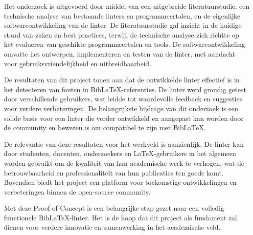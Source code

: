 Het onderzoek is uitgevoerd door middel van een uitgebreide literatuurstudie, een technische analyse van bestaande linters en programmeertalen, en de eigenlijke softwareontwikkeling van de linter. De literatuurstudie gaf inzicht in de huidige stand van zaken en best practices, terwijl de technische analyse zich richtte op het evalueren van geschikte programmeertalen en tools. De softwareontwikkeling omvatte het ontwerpen, implementeren en testen van de linter, met aandacht voor gebruiksvriendelijkheid en uitbreidbaarheid.

De resultaten van dit project tonen aan dat de ontwikkelde linter effectief is in het detecteren van fouten in BibLaTeX-referenties. De linter werd grondig getest door verschillende gebruikers, wat leidde tot waardevolle feedback en suggesties voor verdere verbeteringen. De belangrijkste bijdrage van dit onderzoek is een solide basis voor een linter die verder ontwikkeld en aangepast kan worden door de community en bewezen is om compatibel te zijn met BibLaTeX.

De relevantie van deze resultaten voor het werkveld is aanzienlijk. De linter kan door studenten, docenten, onderzoekers en \LaTeX-gebruikers in het algemeen worden gebruikt om de kwaliteit van hun academische werk te verhogen, wat de betrouwbaarheid en professionaliteit van hun publicaties ten goede komt. Bovendien biedt het project een platform voor toekomstige ontwikkelingen en verbeteringen binnen de open-source community.

Met deze Proof of Concept is een belangrijke stap gezet naar een volledig functionele BibLaTeX-linter. Het is de hoop dat dit project als fundament zal dienen voor verdere innovatie en samenwerking in het academische veld.


